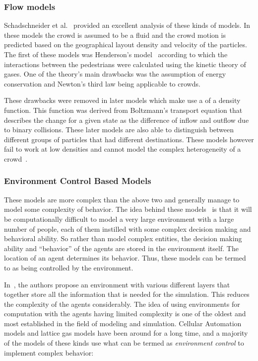 \subsubsection{Flow models}

Schadschneider et al.~\cite{Schadschneider:2008cz} provided an excellent analysis of these kinds of models. In these models the crowd is assumed to be a fluid and the crowd motion is predicted based on the geographical layout density and velocity of the particles. The first of these models was Henderson's model~\cite{Henderson:1974ve} according to which the interactions between the pedestrians were calculated using the kinetic theory of gases. One of the theory's main drawbacks was the assumption of energy conservation and Newton's third law being applicable to crowds.

These drawbacks were removed in later models which make use a of a density function. This function was derived from Boltzmann's transport equation that describes the change for a given state as the difference of inflow and outflow due to binary collisions. These later models are also able to distinguish between different groups of particles that had different destinations. These models however fail to work at low densities and cannot model the complex heterogeneity of a crowd~\cite{Bierlaire:2003uj}.


\subsubsection{Environment Control Based Models}
These models are more complex than the above two and generally manage to model some complexity of behavior. The idea behind these models~\cite{Banerjee:2008jh} is that it will be computationally difficult to model a very large environment with a large number of people, each of them instilled with some complex decision making and behavioral ability. So rather than model complex entities, the decision making ability and ``behavior'' of the agents are stored in the environment itself. The location of an agent determines its behavior. Thus, these models can be termed to as being controlled by the environment.

In~\cite{Banerjee:2008jh,Banerjee:2009jo}, the authors propose an environment with various different layers that together store all the information that is needed for the simulation. This reduces the complexity of the agents considerably. The idea of using environments for computation with the agents having limited complexity is one of the oldest and most established in the field of modeling and simulation. Cellular Automation models and lattice gas models have been around for a long time, and a majority of the models of these kinds use what can be termed as \emph{environment control} to implement complex behavior:

